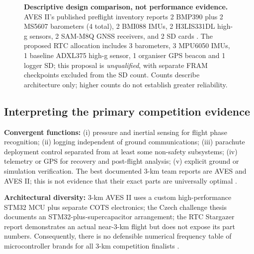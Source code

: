 \documentclass[10pt,a4paper]{article}
\begin{document}
\begin{figure}[htbp]\centering
{}
\caption{\textbf{Descriptive design comparison, not performance evidence.} AVES II's published preflight inventory reports 2 BMP390 plus 2 MS5607 barometers (4 total), 2 BMI088 IMUs, 2 H3LIS331DL high-g sensors, 2 SAM-M8Q GNSS receivers, and 2 SD cards \cite{astg2022aves2}. The proposed RTC allocation includes 3 barometers, 3 MPU6050 IMUs, 1 baseline ADXL375 high-g sensor, 1 organiser GPS beacon and 1 logger SD; this proposal is \emph{unqualified}, with separate FRAM checkpoints excluded from the SD count. Counts describe architecture only; higher counts do not establish greater reliability.}
\label{fig:aves2}
\end{figure}

\subsection{Interpreting the primary competition evidence}
\textbf{Convergent functions:} (i) pressure and inertial sensing for flight phase recognition; (ii) logging independent of ground communications; (iii) parachute deployment control separated from at least some non-safety subsystems; (iv) telemetry or GPS for recovery and post-flight analysis; (v) explicit ground or simulation verification. The best documented 3-km team reports are AVES and AVES II; this is not evidence that their exact parts are universally optimal \cite{astg2021aves,astg2022aves2}.

\textbf{Architectural diversity:} 3-km AVES II uses a custom high-performance STM32 MCU plus separate COTS electronics; the Czech challenge thesis documents an STM32-plus-supercapacitor arrangement; the RTC Stargazer report demonstrates an actual near-3-km flight but does not expose its part numbers. Consequently, there is no defensible numerical frequency table of microcontroller brands for all 3-km competition finalists \cite{astg2022aves2,zapadlo2023,stargazer2026}.
\end{document}
